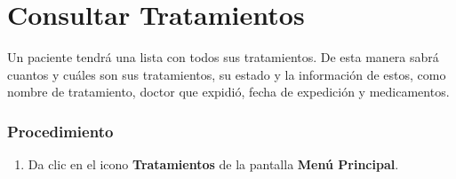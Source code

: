 \section{Consultar Tratamientos}

Un paciente tendrá una lista con todos sus tratamientos. De esta manera sabrá cuantos y cuáles son sus tratamientos, su estado y la información de estos, como nombre de tratamiento, doctor que expidió, fecha de expedición y medicamentos.

\subsubsection{Procedimiento}
\begin{enumerate}
	
	\item Da clic en el icono \textbf{Tratamientos} de la pantalla \textbf{Menú Principal}.


\end{enumerate}
